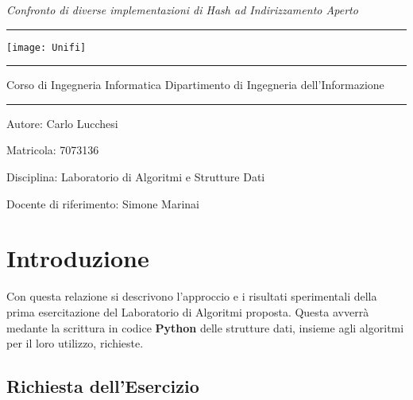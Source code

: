 \documentclass{article}
\newlength{\spacing}
\begin{document}
\begin{titlepage}
\centering \Huge{\textsl{Confronto di diverse implementazioni di Hash ad Indirizzamento Aperto}}
\vspace{\spacing}
\hrule
\vspace{\spacing}

\texttt{[image: Unifi]}
\hrule
\vspace{\spacing}
\huge{Corso di Ingegneria Informatica}
\break
\LARGE{Dipartimento di Ingegneria dell'Informazione}
\vspace{\spacing}
\hrule

\vfill
\raggedright{{\large Autore: Carlo Lucchesi}}
\break
\raggedright{{\large Matricola: 7073136}}
\break
\raggedright{{\large Disciplina: Laboratorio di Algoritmi e Strutture Dati}}
\break
\raggedright{{\large Docente di riferimento: Simone Marinai}}

\end{titlepage}

\newpage

\tableofcontents

\newpage

\pagestyle{fancy}
\fancyhead[C]{}
\fancyfoot[L, C]{}
\fancyfoot[R]{\thepage}

\section{Introduzione}

Con questa relazione si descrivono l'approccio e i risultati sperimentali della prima esercitazione del Laboratorio di Algoritmi proposta. Questa avverrà medante la scrittura in codice \textbf{Python} delle strutture dati, insieme agli algoritmi per il loro utilizzo, richieste.
\subsection{Richiesta dell'Esercizio}
\end{document}
